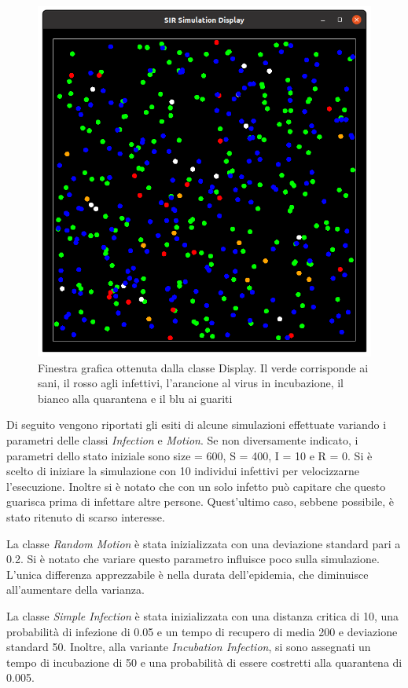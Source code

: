 \documentclass[a4paper,10pt,twocolumn]{article}
\begin{document}
\begin{figure}
    \includegraphics[width=\linewidth]{images/display.png}
    \caption{Finestra grafica ottenuta dalla classe Display. Il verde corrisponde ai sani, il rosso agli infettivi, l'arancione al virus in incubazione, il bianco alla quarantena e il blu ai guariti}
    \label{fig:display}
\end{figure}

Di seguito vengono riportati gli esiti di alcune simulazioni effettuate variando i parametri delle classi \emph{Infection} e \emph{Motion}. Se non diversamente indicato, i parametri  dello stato iniziale sono size = 600, S = 400, I = 10 e  R = 0. Si è scelto di iniziare la simulazione con 10 individui infettivi per velocizzarne l'esecuzione. Inoltre si è notato che  con un solo infetto può capitare che questo guarisca prima di infettare altre persone. Quest'ultimo caso, sebbene possibile, è stato ritenuto di scarso interesse.

La classe \emph{Random Motion} è stata inizializzata con una deviazione standard pari a 0.2. Si è notato che variare questo parametro influisce poco sulla simulazione. L'unica differenza apprezzabile è nella durata dell'epidemia, che diminuisce all'aumentare della varianza.

La classe \emph{Simple Infection} è stata inizializzata con una distanza critica di 10, una probabilità di infezione di 0.05 e un tempo di recupero di media 200 e deviazione standard 50. Inoltre, alla variante \emph{Incubation Infection}, si sono assegnati un tempo di incubazione di 50 e una probabilità di essere costretti alla quarantena di 0.005.
\end{document}
